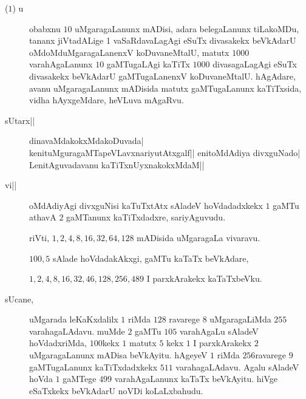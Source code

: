 


\begin{description}
\item[($1$) u] obabxnu $10$ uMgaragaLanunx mADisi, adara belegaLanunx
  tiLakoMDu, tananx jiVtadALige 1 vaSaRdavaLagAgi eSuTx divasakekx
  beVkAdarU oMdoMduMgaragaLanenxV koDuvaneMtalU, matutx $1000$
  varahAgaLanunx $10$ gaMTugaLAgi kaTiTx $1000$ divasagaLagAgi eSuTx
  divasakekx beVkAdarU gaMTugaLanenxV koDuvaneMtalU. hAgAdare, avanu
  uMgaragaLanunx mADisida matutx gaMTugaLanunx kaTiTxsida, vidha
  hAyxgeMdare, heVLuva mAgaRvu.

\item[sUtarx||] dinavaMdakokxMdakoDuvada|
  kenituMguragaMTapeVLavxnariyutAtxgalf|| enitoMdAdiya divxguNado|
  LenitAguvadavanu kaTiTxnUyxnakokxMdaM||

\item[vi||] oMdAdiyAgi divxguNisi kaTuTxtAtx sAladeV hoVdadadxkekx $1$
  gaMTu athavA $2$ gaMTanunx kaTiTxdadxre, sariyAguvudu.

    riVti, $1, 2, 4, 8, 16, 32, 64, 128$  mADisida uMgaragaLa vivaravu.
 
    $100, 5$ sAlade hoVdadakAkxgi, gaMTu kaTaTx beVkAdare,

    $1, 2, 4, 8, 16, 32, 46, 128, 256, 489$ I parxkArakekx kaTaTxbeVku.

\item[sUcane,] uMgarada leKaKxdalilx $1$ riMda $128$ ravarege $8$
  uMgaragaLiMda $255$ varahagaLAdavu. muMde $2$ gaMTu $105$ varahAgaLu
  sAladeV hoVdadxriMda, $100$kekx $1$ matutx $5$ kekx $1$ I parxkArakekx $2$
  uMgaragaLanunx mADisa beVkAyitu. hAgeyeV $1$ riMda $256$ravarege $9$
  gaMTugaLanunx kaTiTxdadxkekx $511$ varahagaLAdavu. Agalu sAladeV hoVda
  $1$ gaMTege $499$ varahAgaLanunx kaTaTx beVkAyitu. hiVge eSaTxkekx
  beVkAdarU noVDi koLaLxbahudu.
\end{description}
